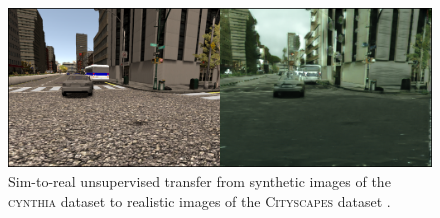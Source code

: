 \begin{figure}[ht]
	\includegraphics[width=\linewidth]{img/transfer}
	\caption{Sim-to-real unsupervised transfer \citep{Liu2017} from synthetic images of the \textsc{cynthia} dataset \citep{Ros2016} to realistic images of the \textsc{Cityscapes} dataset \citep{Cordts2016}.}
	\label{fig:transfer}
\end{figure}

